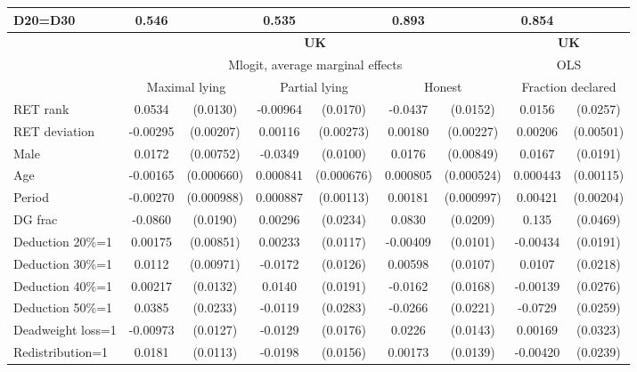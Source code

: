 \begin{tabular}{l|cccccc|cc}
D20=D30         &    0.546         &         &    0.535         &         &    0.893         &         &    0.854         &         \\
\hline\hline
&\multicolumn{6}{c|}{\bf UK}&\multicolumn{2}{c}{\bf UK}\\ &\multicolumn{6}{c|}{Mlogit, average marginal effects }&\multicolumn{2}{c}{OLS}\\
                &\multicolumn{2}{c}{Maximal lying}&\multicolumn{2}{c}{Partial lying}&\multicolumn{2}{c}{Honest}  &\multicolumn{2}{c}{Fraction declared}\\
\hline
RET rank        &   0.0534\sym{***}& (0.0130)& -0.00964         & (0.0170)&  -0.0437\sym{***}& (0.0152)&   0.0156         & (0.0257)\\
RET deviation   & -0.00295         &(0.00207)&  0.00116         &(0.00273)&  0.00180         &(0.00227)&  0.00206         &(0.00501)\\
Male            &   0.0172\sym{**} &(0.00752)&  -0.0349\sym{***}& (0.0100)&   0.0176\sym{**} &(0.00849)&   0.0167         & (0.0191)\\
Age             & -0.00165\sym{**} &(0.000660)& 0.000841         &(0.000676)& 0.000805         &(0.000524)& 0.000443         &(0.00115)\\
Period          & -0.00270\sym{***}&(0.000988)& 0.000887         &(0.00113)&  0.00181\sym{*}  &(0.000997)&  0.00421\sym{**} &(0.00204)\\
DG frac         &  -0.0860\sym{***}& (0.0190)&  0.00296         & (0.0234)&   0.0830\sym{***}& (0.0209)&    0.135\sym{***}& (0.0469)\\
Deduction 20\%=1&  0.00175         &(0.00851)&  0.00233         & (0.0117)& -0.00409         & (0.0101)& -0.00434         & (0.0191)\\
Deduction 30\%=1&   0.0112         &(0.00971)&  -0.0172         & (0.0126)&  0.00598         & (0.0107)&   0.0107         & (0.0218)\\
Deduction 40\%=1&  0.00217         & (0.0132)&   0.0140         & (0.0191)&  -0.0162         & (0.0168)& -0.00139         & (0.0276)\\
Deduction 50\%=1&   0.0385\sym{*}  & (0.0233)&  -0.0119         & (0.0283)&  -0.0266         & (0.0221)&  -0.0729\sym{***}& (0.0259)\\
Deadweight loss=1& -0.00973         & (0.0127)&  -0.0129         & (0.0176)&   0.0226         & (0.0143)&  0.00169         & (0.0323)\\
Redistribution=1&   0.0181         & (0.0113)&  -0.0198         & (0.0156)&  0.00173         & (0.0139)& -0.00420         & (0.0239)\\

\end{tabular}
